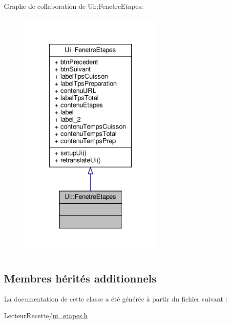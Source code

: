 Graphe de collaboration de Ui\+:\+:Fenetre\+Etapes\+:
\nopagebreak
\begin{figure}[H]
\begin{center}
\leavevmode
\includegraphics[width=206pt]{class_ui_1_1_fenetre_etapes__coll__graph}
\end{center}
\end{figure}
\subsection*{Membres hérités additionnels}


La documentation de cette classe a été générée à partir du fichier suivant \+:\begin{DoxyCompactItemize}
\item 
Lecteur\+Recette/\hyperlink{ui__etapes_8h}{ui\+\_\+etapes.\+h}\end{DoxyCompactItemize}
